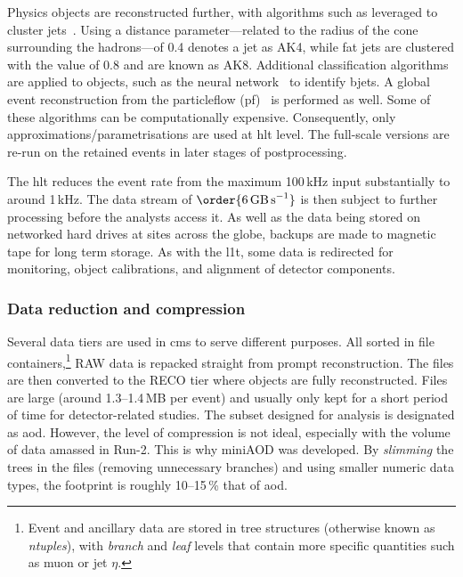 Physics objects are reconstructed further, with algorithms such as  leveraged to cluster \glspl{jet}~\cite{Cacciari:2008gp}. Using a distance parameter---related to the radius of the cone surrounding the hadrons---of 0.4 denotes a \gls{jet} as AK4, while fat jets are clustered with the value of 0.8 and are known as AK8. Additional classification algorithms are applied to objects, such as the \deepcsv neural network~\cite{Sirunyan:2017ezt} to identify \glspl{bjet}. A global event reconstruction from the \gls{particleflow} (\acrshort{pf})~\cite{CMS-PAS-PFT-09-001,CMS-PRF-14-001} is performed as well. Some of these algorithms can be computationally expensive. Consequently, only approximations/parametrisations are used at \acrshort{hlt} level. The full-scale versions are re-run on the retained events in later stages of postprocessing.

The \acrshort{hlt} reduces the event rate from the maximum 100\,kHz input substantially to around 1\,kHz. The data stream of $\order{\text{6\,GB\,s}^{-1}}$ is then subject to further processing before the analysts access it. As well as the data being stored on networked hard drives at sites across the globe, backups are made to magnetic tape for long term storage. As with the \acrlong{l1t}, some data is redirected for monitoring, object calibrations, and alignment of detector components.




\subsubsection{Data reduction and compression}
\label{subsubsec:cms_data_tiers}

Several data tiers are used in \acrshort{cms} to serve different purposes. All sorted in \ROOT file containers,\footnote{Event and ancillary data are stored in tree structures (otherwise known as \emph{ntuples}), with \emph{branch} and \emph{leaf} levels that contain more specific quantities such as muon \pt or \gls{jet} $\eta$.} RAW data is repacked straight from prompt reconstruction. The files are then converted to the RECO tier where objects are fully reconstructed. Files are large (around 1.3--1.4\,MB per event) and usually only kept for a short period of time for detector-related studies. The subset designed for analysis is designated as \acrfull{aod}. However, the level of compression is not ideal, especially with the volume of data amassed in Run-2. This is why miniAOD was developed. By \emph{slimming} the trees in the files (removing unnecessary branches) and using smaller numeric data types, the footprint is roughly 10--15\,\% that of \acrshort{aod}.

